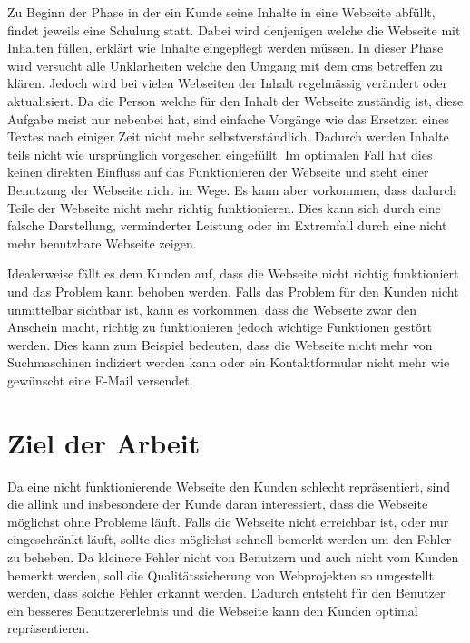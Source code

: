 Zu Beginn der Phase in der ein Kunde seine Inhalte in eine Webseite abfüllt, findet jeweils eine Schulung statt. Dabei wird denjenigen welche die Webseite mit Inhalten füllen, erklärt wie Inhalte eingepflegt werden müssen. In dieser Phase wird versucht alle Unklarheiten welche den Umgang mit dem \ac{cms} betreffen zu klären. Jedoch wird bei vielen Webseiten der Inhalt regelmässig verändert oder aktualisiert. Da die Person welche für den Inhalt der Webseite zuständig ist, diese Aufgabe meist nur nebenbei hat, sind einfache Vorgänge wie das Ersetzen eines Textes nach einiger Zeit nicht mehr selbstverständlich. Dadurch werden Inhalte teils nicht wie ursprünglich vorgesehen eingefüllt. Im optimalen Fall hat dies keinen direkten Einfluss auf das Funktionieren der Webseite und steht einer Benutzung der Webseite nicht im Wege. Es kann aber vorkommen, dass dadurch Teile der Webseite nicht mehr richtig funktionieren. Dies kann sich durch eine falsche Darstellung, verminderter Leistung oder im Extremfall durch eine nicht mehr benutzbare Webseite zeigen.

Idealerweise fällt es dem Kunden auf, dass die Webseite nicht richtig funktioniert und das Problem kann behoben werden. Falls das Problem für den Kunden nicht unmittelbar sichtbar ist, kann es vorkommen, dass die Webseite zwar den Anschein macht, richtig zu funktionieren jedoch wichtige Funktionen gestört werden. Dies kann zum Beispiel bedeuten, dass die Webseite nicht mehr von Suchmaschinen indiziert werden kann oder ein Kontaktformular nicht mehr wie gewünscht eine E-Mail versendet.

\section{Ziel der Arbeit}
\label{sec:ziel_der_arbeit}
Da eine nicht funktionierende Webseite den Kunden schlecht repräsentiert, sind die allink und insbesondere der Kunde daran interessiert, dass die Webseite möglichst ohne Probleme läuft. Falls die Webseite nicht erreichbar ist, oder nur eingeschränkt läuft, sollte dies möglichst schnell bemerkt werden um den Fehler zu beheben. Da kleinere Fehler nicht von Benutzern und auch nicht vom Kunden bemerkt werden, soll die Qualitätssicherung von Webprojekten so umgestellt werden, dass solche Fehler erkannt werden. Dadurch entsteht für den Benutzer ein besseres Benutzererlebnis und die Webseite kann den Kunden optimal repräsentieren.
